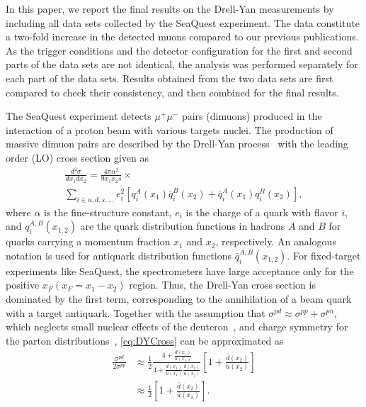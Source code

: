 \documentclass[reprint,aps,unsortedaddress,superscriptaddress,prl,floatfix,showpacs,linenumbers,final]{revtex4-2}
\begin{document}
In this paper, we report the final results on the Drell-Yan measurements
by including all data sets collected by the SeaQuest experiment.
The data constitute a two-fold increase in the detected muons compared
to our previous publications. As the trigger
conditions and the detector configuration for the first and second parts
of the data sets are not
identical, the analysis was performed separately for each part of the
data sets.
Results obtained from the two data sets are first compared to check their
consistency, and then combined for the final results.

The SeaQuest experiment detects $\mu^+\mu^-$ pairs (dimuons) produced in
the interaction of a proton beam with various targets nuclei. The production
of massive dimuon pairs are described by the Drell-Yan
process~\cite{drell1970} with the leading order (LO) cross section given as
\begin{multline}
	\frac{d^2\sigma}{dx_1dx_2}=\frac{4\pi \alpha^2}{9x_1x_2s} \times
	\label{eq:DYCross} \\
	\sum_{i\in u,d,s,\dots} e_i^2 \left[q_i^A\left(x_1\right) \bar q_i^B\left(x_2\right) + \bar q_i^A\left(x_1\right)
		q_i^B\left(x_2\right)\right],
\end{multline}
where $\alpha$ is the fine-structure constant, $e_i$ is the charge of a quark
with flavor $i$, and $q_i^{A,B}\left(x_{1,2}\right)$ are the quark
distribution functions in hadrons $A$ and $B$
for quarks carrying a momentum fraction $x_1$ and $x_2$, respectively.
An analogous notation is used for antiquark distribution functions
$\bar q_i^{A,B}\left(x_{1,2}\right)$.
For fixed-target experiments like SeaQuest, the spectrometers have
large acceptance only for the positive $x_F (x_F = x_1 - x_2)$ region. %
Thus, the Drell-Yan cross section is dominated by
the first term, corresponding to the annihilation of a beam quark with
a target antiquark. Together with the assumption that
$\sigma^{pd} \approx \sigma^{pp} + \sigma^{pn}$,
which neglects small nuclear effects of the
deuteron~\cite{kumano1998,ehlers2014},
and charge symmetry for the parton distributions~\cite{londergan2010},
\cref{eq:DYCross} can be approximated as
\begin{equation}
	\begin{split}
		\frac{\sigma^{pd}}{2\sigma^{pp}} & \approx
		\frac{1}{2} \frac{4+\frac{d\left(x_1\right)}
			{u\left(x_1\right)}}{4+\frac{d\left(x_1\right)}
			{u\left(x_1\right)}\frac{\bar d\left(x_2\right)}{\bar u\left(x_2\right)}}
		\left[1+\frac{\bar d\left(x_2\right)}{\bar u\left(x_2\right)}\right]                         \\
		                                 & \approx \frac{1}{2} \left[1+\frac{\bar d\left(x_2\right)}
			{\bar u\left(x_2\right)}\right].
	\end{split}
	\label{eq:crRatio}
\end{equation}
\end{document}
